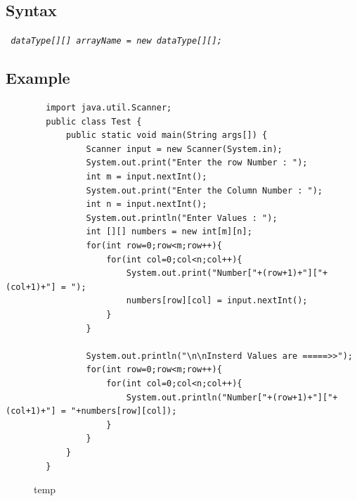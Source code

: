 \documentclass[openany]{book}  %
\begin{document}
\subsection{Syntax}
\begin{center}
    \tt{
        \textit{dataType[][] arrayName = new dataType[][];}
    }
\end{center}

% 
%
\subsection{Example}
\begin{center}
    \begin{verbatim}
        import java.util.Scanner;
        public class Test {
            public static void main(String args[]) {
                Scanner input = new Scanner(System.in);
                System.out.print("Enter the row Number : ");
                int m = input.nextInt();
                System.out.print("Enter the Column Number : ");
                int n = input.nextInt();
                System.out.println("Enter Values : ");
                int [][] numbers = new int[m][n];
                for(int row=0;row<m;row++){
                    for(int col=0;col<n;col++){
                        System.out.print("Number["+(row+1)+"]["+(col+1)+"] = ");
                        numbers[row][col] = input.nextInt();
                    }
                }

                System.out.println("\n\nInsterd Values are =====>>");
                for(int row=0;row<m;row++){
                    for(int col=0;col<n;col++){
                        System.out.println("Number["+(row+1)+"]["+(col+1)+"] = "+numbers[row][col]);
                    }
                }
            }
        }
    \end{verbatim}
\end{center}
% 
% 
\begin{figure}[htbp]
    \begin{center}
        \caption{temp\cite{Ref3}}
    \end{center}
\end{figure}
% 
% 
\end{document}
